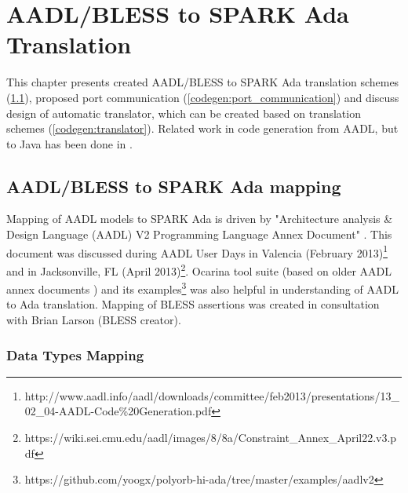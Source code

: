 
\cleardoublepage


\chapter{AADL/BLESS to SPARK Ada Translation}
\label{codegen}

This chapter presents created AADL/BLESS to SPARK Ada translation schemes (\ref{codegen:mapping}), proposed port communication (\ref{codegen:port_communication}) and discuss design of automatic translator, which can be created based on translation schemes (\ref{codegen:translator}). Related work in code generation from AADL, but to Java has been done in \cite{MAP:Paper}. 



\section{AADL/BLESS to SPARK Ada mapping}
\label{codegen:mapping}


Mapping of AADL models to SPARK Ada is driven by "Architecture analysis \& Design Language (AADL) V2 Programming Language Annex Document" \cite{AnnexDoc}. This document was discussed during AADL User Days in Valencia (February 2013)\footnote{http://www.aadl.info/aadl/downloads/committee/feb2013/presentations/13\_02\_04-AADL-Code\%20Generation.pdf} and in Jacksonville, FL (April 2013)\footnote{https://wiki.sei.cmu.edu/aadl/images/8/8a/Constraint\_Annex\_April22.v3.pdf}. Ocarina tool suite (based on older AADL annex documents \cite{Ocarina:Article}) and its examples\footnote{https://github.com/yoogx/polyorb-hi-ada/tree/master/examples/aadlv2} was also helpful in understanding of AADL to Ada translation. Mapping of BLESS assertions was created in consultation with Brian Larson (BLESS creator).




\subsection{Data Types Mapping}
\label{codegen:mapping:data}

